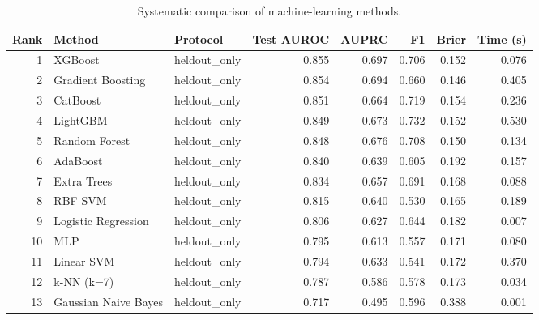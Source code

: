 \begin{table}[htbp]
\centering
\caption{Systematic comparison of machine-learning methods.}
\label{tab:method_comparison_recomputed}
\begin{tabular}{rllrrrrr}
\toprule
Rank & Method & Protocol & Test AUROC & AUPRC & F1 & Brier & Time (s) \\
\midrule
1 & XGBoost & heldout\_only & 0.855 & 0.697 & 0.706 & 0.152 & 0.076 \\
2 & Gradient Boosting & heldout\_only & 0.854 & 0.694 & 0.660 & 0.146 & 0.405 \\
3 & CatBoost & heldout\_only & 0.851 & 0.664 & 0.719 & 0.154 & 0.236 \\
4 & LightGBM & heldout\_only & 0.849 & 0.673 & 0.732 & 0.152 & 0.530 \\
5 & Random Forest & heldout\_only & 0.848 & 0.676 & 0.708 & 0.150 & 0.134 \\
6 & AdaBoost & heldout\_only & 0.840 & 0.639 & 0.605 & 0.192 & 0.157 \\
7 & Extra Trees & heldout\_only & 0.834 & 0.657 & 0.691 & 0.168 & 0.088 \\
8 & RBF SVM & heldout\_only & 0.815 & 0.640 & 0.530 & 0.165 & 0.189 \\
9 & Logistic Regression & heldout\_only & 0.806 & 0.627 & 0.644 & 0.182 & 0.007 \\
10 & MLP & heldout\_only & 0.795 & 0.613 & 0.557 & 0.171 & 0.080 \\
11 & Linear SVM & heldout\_only & 0.794 & 0.633 & 0.541 & 0.172 & 0.370 \\
12 & k-NN (k=7) & heldout\_only & 0.787 & 0.586 & 0.578 & 0.173 & 0.034 \\
13 & Gaussian Naive Bayes & heldout\_only & 0.717 & 0.495 & 0.596 & 0.388 & 0.001 \\
\bottomrule
\end{tabular}

\end{table}
